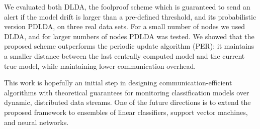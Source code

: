 %
We evaluated both DLDA, the foolproof scheme which is guaranteed to send an
alert if the model drift is larger than a pre-defined threshold, and its probabilistic 
version PDLDA, on three real data sets.
For a small number of nodes we used DLDA, and for larger numbers of nodes 
PDLDA was tested. We showed that the proposed scheme outperforms the periodic update algorithm (PER): it maintains a smaller distance between
the last centrally computed model and the current true model, while maintaining 
lower communication overhead.

This work is hopefully an initial step in designing communication-efficient algorithms
with theoretical guarantees for monitoring classification models over dynamic, distributed data streams. One of the future directions is to extend the proposed framework to
ensembles of linear classifiers, support vector machines, and neural networks.


\nocite{*}

